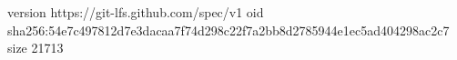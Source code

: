 version https://git-lfs.github.com/spec/v1
oid sha256:54e7c497812d7e3dacaa7f74d298c22f7a2bb8d2785944e1ec5ad404298ac2c7
size 21713
